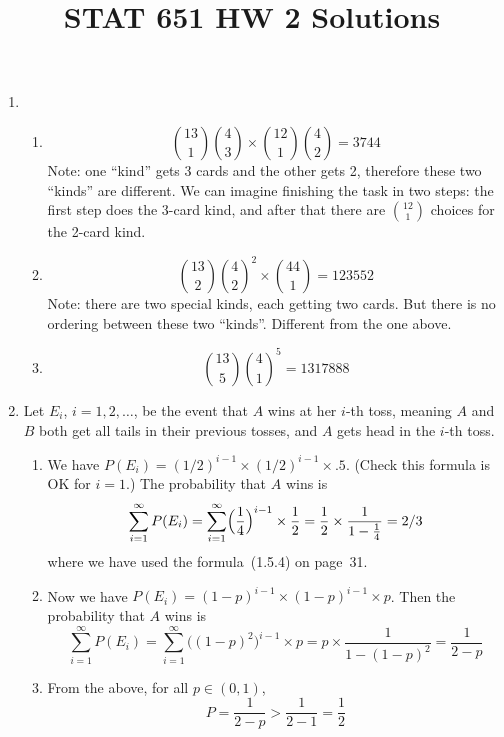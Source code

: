 \documentclass[12pt]{article}
\begin{document}
\title{STAT 651 HW 2 Solutions}
\maketitle

\begin{enumerate}
\item
    \begin{enumerate}
    \item
    \[
        {13\choose 1}{4\choose 3}\times {12\choose 1}{4\choose 2}
        = 3744
    \]
    Note: one ``kind'' gets 3 cards and the other gets 2,
    therefore these two ``kinds'' are different.
    We can imagine finishing the task in two steps:
    the first step does the 3-card kind,
    and after that there are ${12\choose 1}$ choices for the
    2-card kind.
    \item
    \[
        {13\choose 2}{4\choose 2}^2\times {44\choose 1}
        = 123552
    \]
    Note: there are two special kinds, each getting two cards.
    But there is no ordering between these two ``kinds''.
    Different from the one above.
    \item
    \[
        {13\choose 5}{4\choose 1}^5 = 1317888
    \]
    \end{enumerate}

\item
Let $E_i$, $i=1,2,\dotsc$, be the event that $A$ wins at her $i$-th toss,
meaning $A$ and $B$ both get all tails in their previous tosses,
and $A$ gets head in the $i$-th toss.
\begin{enumerate}
\item
We have
$P(E_i) = (1/2)^{i-1}\times (1/2)^{i-1} \times .5$.
(Check this formula is OK for $i=1$.)
The probability that $A$ wins is
\[
\sum_{i=1}^{\infty} P(E_i)
= \sum_{i=1}^{\infty} \Bigl(\frac{1}{4}\Bigr)^{i-1} \times \frac{1}{2}
= \frac{1}{2} \times \frac{1}{1 - \frac{1}{4}}
= 2/3
\]
where we have used the formula~(1.5.4) on page~31.

\item
Now we have
$P(E_i) = (1-p)^{i-1}\times (1-p)^{i-1} \times p$.
Then the probability that $A$ wins is
\[
\sum_{i=1}^{\infty} P(E_i)
= \sum_{i=1}^{\infty} \bigl((1-p)^2\bigr)^{i-1}\times p
= p \times \frac{1}{1 - (1-p)^2}
= \frac{1}{2-p}
\]

\item
From the above,
for all $p \in (0,1)$,
\[
P = \frac{1}{2 - p} > \frac{1}{2 - 1} = \frac{1}{2}
\]
\end{enumerate}


\end{enumerate}
\end{document}
